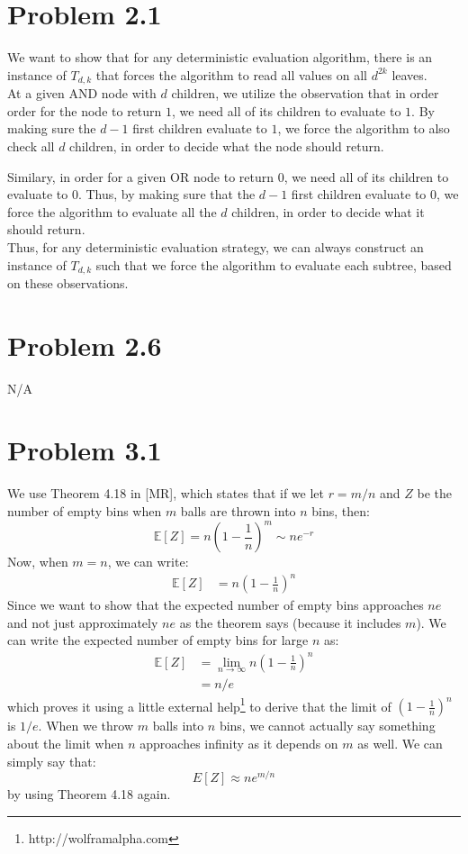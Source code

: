 \documentclass[a4paper]{article}
\begin{document}
\section*{Problem 2.1}
We want to show that for any deterministic evaluation algorithm, there is an instance of $T_{d,k}$ that forces the algorithm to read all values on all $d^{2k}$ leaves.\\

At a given AND node with $d$ children, we utilize the observation that in order order for the node to return $1$, we need all of its children to evaluate to $1$. By making sure the $d-1$ first children evaluate to $1$, we force the algorithm to also check all $d$ children, in order to decide what the node should return.

Similary, in order for a given OR node to return $0$, we need all of its children to evaluate to $0$. Thus, by making sure that the $d-1$ first children evaluate to $0$, we force the algorithm to evaluate all the $d$ children, in order to decide what it should return.\\

Thus, for any deterministic evaluation strategy, we can always construct an instance of $T_{d,k}$ such that we force the algorithm to evaluate each subtree, based on these observations.

\section*{Problem 2.6}
N/A

\section*{Problem 3.1}
We use Theorem 4.18 in [MR], which states that if we let $r=m/n$ and $Z$ be the number of empty bins when $m$ balls are thrown into $n$ bins, then:
$$
\mathbb{E}[Z]=n\left( 1-\frac{1}{n}\right) ^m\sim ne^{-r}
$$
Now, when $m=n$, we can write:
\begin{align*}
  \mathbb{E}[Z]&= n\left( 1-\frac{1}{n}\right) ^n
\end{align*}
Since we want to show that the expected number of empty bins approaches $ne$ and not just approximately $ne$ as the theorem says (because it includes $m$). We can write the expected number of empty bins for large $n$ as:
\begin{align*}
  \mathbb{E}[Z]&= \lim_{n\rightarrow \infty} n\left( 1-\frac{1}{n}\right) ^n \\
               &= n/e
\end{align*}
which proves it using a little external help\footnote{http://wolframalpha.com} to derive that the limit of $(1-\frac{1}{n})^n$ is $1/e$. When we throw $m$ balls into $n$ bins, we cannot actually say something about the limit when $n$ approaches infinity as it depends on $m$ as well. We can simply say that:
$$
E[Z]\approx ne^{m/n}
$$
by using Theorem 4.18 again.
\end{document}
